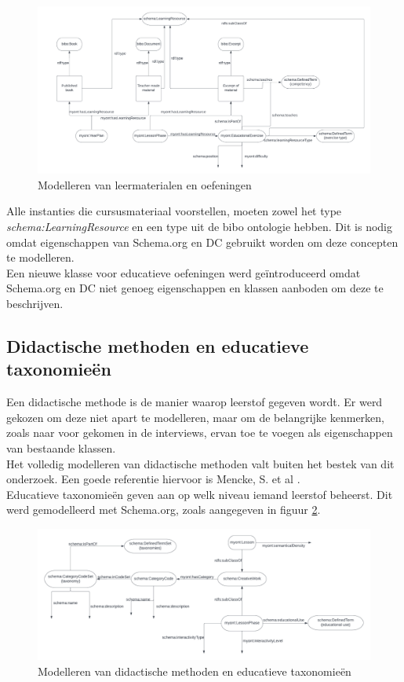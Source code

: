 \documentclass[12pt,journal]{IEEEtran}
\begin{document}
	\begin{figure}[h]
		\centering
		\caption{Modelleren van leermaterialen en oefeningen}
		\label{fig:uml-materialdata}
		\includegraphics[scale=0.25]{uml-materialdata.png}
	\end{figure}
	\noindent Alle instanties die cursusmateriaal voorstellen, moeten zowel het type \textit{schema:LearningResource} en een type uit de bibo ontologie hebben.
	Dit is nodig omdat eigenschappen van Schema.org en DC gebruikt worden om deze concepten te modelleren.\\
	Een nieuwe klasse voor educatieve oefeningen werd geïntroduceerd omdat Schema.org en DC niet genoeg eigenschappen en klassen aanboden om deze te beschrijven.

	\subsection{Didactische methoden en educatieve taxonomieën}

	\noindent Een didactische methode is de manier waarop leerstof gegeven wordt.
	Er werd gekozen om deze niet apart te modelleren, maar om de belangrijke kenmerken, zoals naar voor gekomen in de interviews, ervan toe te voegen als eigenschappen van bestaande klassen.\\
	Het volledig modelleren van didactische methoden valt buiten het bestek van dit onderzoek. Een goede referentie hiervoor is Mencke, S. et al \cite{hierarchy}.\\
	Educatieve taxonomieën geven aan op welk niveau iemand leerstof beheerst.
	Dit werd gemodelleerd met Schema.org, zoals aangegeven in figuur \ref{fig:uml-dm}.

	\begin{figure}[h]
		\caption{Modelleren van didactische methoden en educatieve taxonomieën}
		\label{fig:uml-dm}
		\includegraphics[scale=0.3]{uml-taxonomies.png}
	\end{figure}
\end{document}
